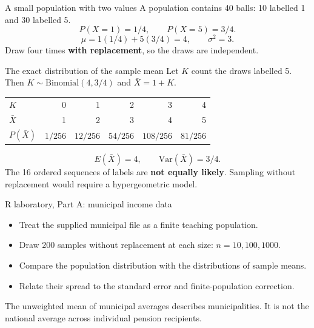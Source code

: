 \begin{frame}{A small population with two values}
A population contains 40 balls: 10 labelled 1 and 30 labelled 5.
\[P(X=1)=1/4,\qquad P(X=5)=3/4.\]
\[\mu=1(1/4)+5(3/4)=4,\qquad \sigma^2=3.\]
Draw four times \textbf{with replacement}, so the draws are independent.
\end{frame}
\begin{frame}{The exact distribution of the sample mean}
Let $K$ count the draws labelled 5. Then $K\sim\mathrm{Binomial}(4,3/4)$ and $\bar X=1+K$.
\begin{center}\begin{tabular}{lrrrrr}\toprule
$K$ & 0 & 1 & 2 & 3 & 4\\
$\bar X$ & 1 & 2 & 3 & 4 & 5\\
$P(\bar X)$ & $1/256$ & $12/256$ & $54/256$ & $108/256$ & $81/256$\\\bottomrule\end{tabular}\end{center}
\[E(\bar X)=4,\qquad \mathrm{Var}(\bar X)=3/4.\]
The 16 ordered sequences of labels are \textbf{not equally likely}. Sampling without replacement would require a hypergeometric model.
\end{frame}
\begin{frame}{R laboratory, Part A: municipal income data}
\begin{itemize}
\item Treat the supplied municipal file as a finite teaching population.
\item Draw 200 samples without replacement at each size: $n=10,100,1000$.
\item Compare the population distribution with the distributions of sample means.
\item Relate their spread to the standard error and finite-population correction.
\end{itemize}
The unweighted mean of municipal averages describes municipalities. It is not the national average across individual pension recipients.
\end{frame}
